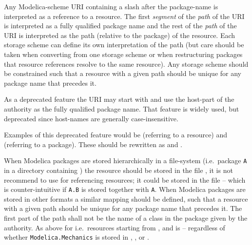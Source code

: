 Any Modelica-scheme URI containing a slash after the package-name is
interpreted as a reference to a resource. The first \emph{segment} of the
\emph{path} of the URI is interpreted as a fully qualified package name and the rest of the \emph{path}
of the URI is interpreted as the path (relative to the package)
of the resource. Each storage scheme can define its own interpretation
of the path (but care should be taken when converting from one storage
scheme or when restructuring packages that resource references resolve
to the same resource). Any storage scheme should be constrained such
that a resource with a given path should be unique for any package name
that precedes it.

As a deprecated feature the URI may start with  and use the host-part of the authority as the fully qualified package name.
That feature is widely used, but deprecated since host-names are generally case-insensitive.
\begin{nonnormative}
Examples of this deprecated feature would be  (referring to a resource) and  (referring to a package).
These should be rewritten as  and .
\end{nonnormative}

When Modelica packages are stored hierarchically in a file-system (i.e.\ package \lstinline!A! in a directory  containing ) the resource
 should be stored in the file , it is not recommend to use  for referencing
resources; it could be stored in the file  -- which is counter-intuitive if \lstinline!A.B! is stored together with \lstinline!A!.  When Modelica packages
are stored in other formats a similar mapping should be defined, such that a resource with a given path should be unique for any package name that precedes it.  The first
part of the path shall not be the name of a class in the package given by the authority.  As above for  i.e.\ resources starting from
, and  is  -- regardless of whether \lstinline!Modelica.Mechanics!
is stored in , , or .

